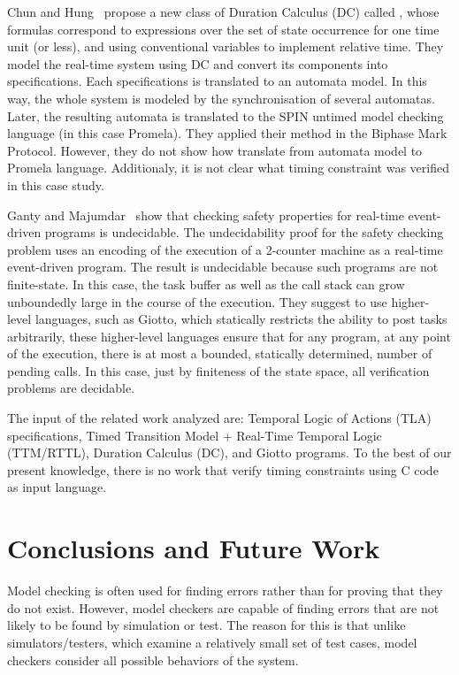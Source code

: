 \documentclass{llncs}
\begin{document}
Chun and Hung~\cite{Chun04} propose a new class of Duration Calculus (DC) called , 
whose formulas correspond to expressions over the set of state occurrence for one time unit (or less),
and using conventional variables to implement relative time. 
They model the real-time system using DC and convert its components into  specifications. 
Each  specifications is translated to an automata model.
In this way, the whole system is modeled by the synchronisation of several automatas. 
Later, the resulting automata is translated to the SPIN untimed model checking language (in this case Promela). 
They applied their method in the Biphase Mark Protocol. 
However, they do not show how translate from automata model to Promela language. 
Additionaly, it is not clear what timing constraint was verified in this case study.

Ganty and Majumdar~\cite{Ganty09} show that checking safety properties for real-time event-driven programs
is undecidable. The undecidability proof for the safety checking problem uses an encoding 
of the execution of a 2-counter machine as a real-time event-driven program. 
The result is undecidable because such programs are not finite-state.
In this case, the task buffer as well as the call stack can grow unboundedly
large in the course of the execution.
They suggest to use higher-level languages, such as Giotto, 
which statically restricts the ability to
post tasks arbitrarily, these higher-level languages ensure that for any 
program, at any point of the execution, there is at most a bounded, statically determined, 
number of pending calls. In this case, just by finiteness of the
state space, all verification problems are decidable.


The input of the related work analyzed are: Temporal Logic of Actions (TLA) specifications, 
Timed Transition Model + Real-Time Temporal Logic (TTM/RTTL), 
Duration Calculus (DC), and Giotto programs. 
To the best of our present knowledge, there is no work that verify timing constraints using 
C code as input language.



\section{Conclusions and Future Work}



Model checking is often used for finding errors rather than for proving that they do not exist.
However, model checkers are capable of finding errors that are not likely to be found by simulation or test.
The reason for this is that unlike simulators/testers, which examine a relatively small set of
test cases, model checkers consider all possible behaviors of the system.
\end{document}
